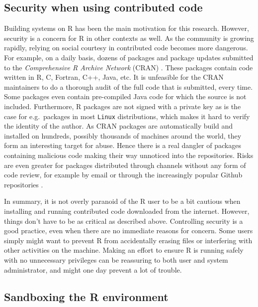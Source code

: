 \documentclass{jss}
\newcommand{\R}{\textsf{R}\xspace}
\newcommand{\Java}{\textsf{Java}\xspace}
\newcommand{\C}{\textsf{C}\xspace}
\newcommand{\Cpp}{\textsf{C++}\xspace}
\newcommand{\Fortran}{\textsf{Fortran}\xspace}
\newcommand{\Linux}{\texttt{Linux}\xspace}
\begin{document}
\subsection{Security when using contributed code}

Building systems on \R has been the main motivation for this research. However,
security is a concern for \R in other contexts as well. As the community is
growing rapidly, relying on social courtesy in contributed code becomes more
dangerous. For example, on a daily basis, dozens of packages and package updates
submitted to the \emph{Comprehensive R Archive Network} (CRAN)
\citep{ripleycran}. These packages contain code written in \R, \C, \Fortran,
\Cpp, \Java, etc. It is unfeasible for the CRAN maintainers to do a thorough
audit of the full code that is submitted, every time. Some packages even contain
pre-compiled \Java code for which the source is not included. Furthermore, \R
packages are not signed with a private key as is the case for e.g.\ packages in
most \Linux distributions, which makes it hard to verify the identity of the
author. As CRAN packages are automatically build and installed on hundreds,
possibly thousands of machines around the world, they form an interesting
target for abuse. Hence there is a real dangler of packages containing
malicious code making their way unnoticed into the repositories. Risks are even
greater for packages distributed through channels without any form of code
review, for example by email or through the increasingly popular Github
repositories \citep{torvalds2010git,dabbish2012social}.

In summary, it is not overly paranoid of the \R user to be a bit cautious when
installing and running contributed code downloaded from the internet. However,
things don't have to be as critical as described above. Controlling security is
a good practice, even when there are no immediate reasons for concern. Some
users simply might want to prevent \R from accidentally erasing files or
interfering with other activities on the machine. Making an effort to ensure \R
is running safely with no unnecessary privileges can be reassuring to both user
and system administrator, and might one day prevent a lot of trouble.

\subsection[Sandboxing the R environment]{Sandboxing the \R environment}
\end{document}
